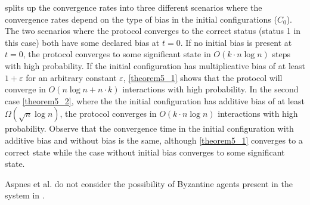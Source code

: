  splits up the convergence rates into three different scenarios where the convergence rates depend on the type of bias in the initial configurations ($C_0$). The two scenarios where the protocol converges to the correct status (status 1 in this case) both have some declared bias at $t = 0$. If no initial bias is present at $t = 0$, the protocol converges to some significant state in $O(k \cdot n \log n)$ steps with high probability. If the initial configuration has multiplicative bias of at least $1 + \varepsilon$ for an arbitrary constant $\varepsilon$, \ref{theorem5_1} shows that the protocol will converge in $O(n \log n + n \cdot k)$ interactions with high probability. In the second case \ref{theorem5_2}, where the the initial configuration has additive bias of at least $\Omega(\sqrt{n} \log n)$, the protocol converges in $O(k \cdot n \log n)$ interactions with high probability. Observe that the convergence time in the initial configuration with additive bias and without bias is the same, although \ref{theorem5_1} converges to a correct state while the case without initial bias converges to some significant state. 

 Aspnes et al. do not consider the possibility of Byzantine agents present in the system in \cite{AspnesFastConverganceOfKOpinion2023}. 


